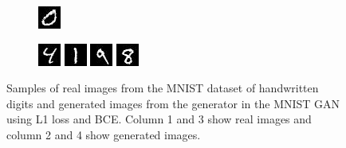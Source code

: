 \documentclass[12pt, fleqn, titlepage]{article}
\newcommand\skipper{1.4pt}
\newcommand\ripper{2.5pt}
\begin{document}
\begin{figure}[H]
\begin{subfigure}[b]{0.7\textwidth}
		\hskip\skipper
		\includegraphics[width=0.22\linewidth]{imgs/MNIST_GAN_normal_fake_5}
	\end{subfigure}
	\vskip\ripper
	\begin{subfigure}[b]{0.7\textwidth}
		\centering
		\includegraphics[width=0.22\linewidth]{imgs/MNIST_GAN_normal_real_6}
		\hskip\skipper
		\includegraphics[width=0.22\linewidth]{imgs/MNIST_GAN_normal_fake_6}
		\hskip\skipper
		\includegraphics[width=0.22\linewidth]{imgs/MNIST_GAN_normal_real_7}
		\hskip\skipper
		\includegraphics[width=0.22\linewidth]{imgs/MNIST_GAN_normal_fake_7}
	\end{subfigure}
	\caption{Samples of real images from the MNIST dataset of handwritten digits and generated images from the generator in the MNIST GAN using L1 loss and BCE. Column 1 and 3 show real images and column 2 and 4 show generated images.}
	\label{fig:generated_images_MNIST_GAN_normal}
\end{figure}
\end{document}
